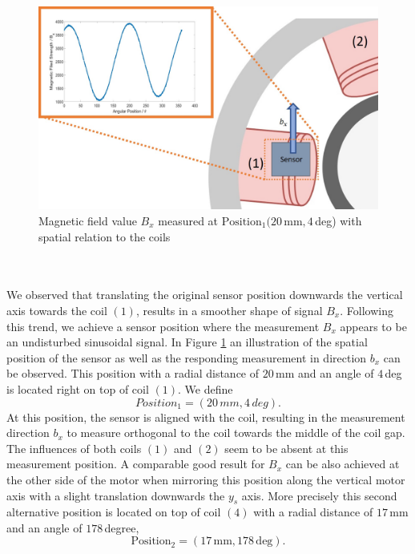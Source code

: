 \documentclass[english]{isasthesis}
\begin{document}
    	 \begin{figure}[t]
    		\centering
    			\includegraphics[width=1\textwidth]{figures/Positions/position_one_relation_1.jpg} 	
    		\caption{Magnetic field value $B_x$ measured at $\text{Position}_1(20\,$mm$, 4\,$deg) with spatial relation to the coils}
    		\label{fig:position one relation}
    		\end{figure}   	
    	 \\\\We observed that translating the original sensor position downwards the vertical axis towards the coil $(1)$, results in a smoother shape of signal $B_x$. Following this trend, we achieve a sensor position where the measurement $B_x$ appears to be an undisturbed sinusoidal signal. In Figure \ref{fig:position one relation} an illustration of the spatial position of the sensor as well as the responding measurement in direction $b_x$ can be observed. This position with a radial distance of $20\,$mm and an angle of $4\,$deg is located right on top of coil $(1)$. We define 
    	 \begin{equation} \label{eq:position}
    	 	Position_1 = (20\,mm, 4\,deg).
    	 \end{equation}
    	 At this position, the sensor is aligned with the coil, resulting in the measurement direction $b_x$ to measure orthogonal to the coil towards the middle of the coil gap. The influences of both coils $(1)$ and $(2)$ seem to be absent at this measurement position. A comparable good result for $B_x$ can be also achieved at the other side of the motor when mirroring this position along the vertical motor axis with a slight translation downwards the $y_s$ axis. More precisely this second alternative position is located on top of coil $(4)$ with a radial distance of $17\,$mm and an angle of $178\,$degree, 
    	 \begin{equation}
    	 \text{Position}_2 = (17\,\text{mm}, 178\,\text{deg}).
		 \end{equation}    	 		
\end{document}
